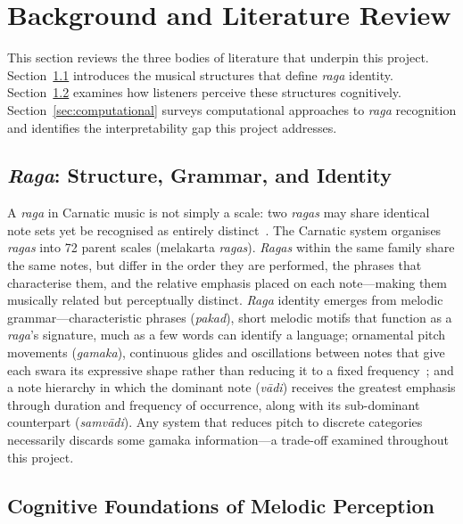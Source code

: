 \documentclass[11pt,a4paper]{article}
\begin{document}
{\section{Background and Literature Review}

This section reviews the three bodies of literature that underpin this project. Section~\ref{sec:raga-structure} introduces the musical structures that define \textit{raga} identity. Section~\ref{sec:cognitive} examines how listeners perceive these structures cognitively. Section~\ref{sec:computational} surveys computational approaches to \textit{raga} recognition and identifies the interpretability gap this project addresses.

\subsection{\textit{Raga}: Structure, Grammar, and Identity}
\label{sec:raga-structure}

A \textit{raga} in Carnatic music is not simply a scale: two \textit{ragas} may share identical note sets yet be recognised as entirely distinct~\cite{viswanathan2004}. The Carnatic system organises \textit{ragas} into 72 parent scales (melakarta \textit{ragas}). \textit{Ragas} within the same family share the same notes, but differ in the order they are performed, the phrases that characterise them, and the relative emphasis placed on each note---making them musically related but perceptually distinct. \textit{Raga} identity emerges from melodic grammar---characteristic phrases (\textit{pakad}), short melodic motifs that function as a \textit{raga}'s signature, much as a few words can identify a language; ornamental pitch movements (\textit{gamaka}), continuous glides and oscillations between notes that give each swara its expressive shape rather than reducing it to a fixed frequency~\cite{krishnaswamy2003,krishna2012}; and a note hierarchy in which the dominant note (\textit{v\=adi}) receives the greatest emphasis through duration and frequency of occurrence, along with its sub-dominant counterpart (\textit{samv\=adi}). Any system that reduces pitch to discrete categories necessarily discards some gamaka information---a trade-off examined throughout this project.

\subsection{Cognitive Foundations of Melodic Perception}
\label{sec:cognitive}

}
\end{document}
